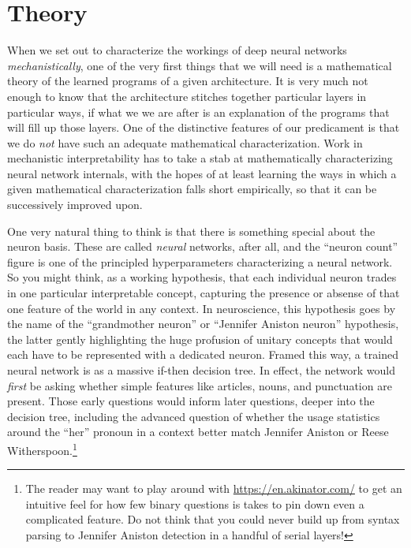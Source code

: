 \section{Theory}
When we set out to characterize the workings of deep neural networks
\emph{mechanistically}, one of the very first things that we will need is a
mathematical theory of the learned programs of a given architecture. It is very
much not enough to know that the architecture stitches together particular
layers in particular ways, if what we we are after is an explanation of the
programs that will fill up those layers. One of the distinctive features of our
predicament is that we do \emph{not} have such an adequate mathematical
characterization. Work in mechanistic interpretability has to take a stab at
mathematically characterizing neural network internals, with the hopes of at
least learning the ways in which a given mathematical characterization falls
short empirically, so that it can be successively improved upon.

One very natural thing to think is that there is something special about the
neuron basis. These are called \emph{neural} networks, after all, and the
``neuron count'' figure is one of the principled hyperparameters characterizing
a neural network. So you might think, as a working hypothesis, that each
individual neuron trades in one particular interpretable concept, capturing the
presence or absense of that one feature of the world in any context. In
neuroscience, this hypothesis goes by the name of the ``grandmother neuron'' or
``Jennifer Aniston neuron'' hypothesis, the latter gently highlighting the huge
profusion of unitary concepts that would each have to be represented with a
dedicated neuron. Framed this way, a trained neural network is as a massive
if-then decision tree. In effect, the network would \emph{first} be asking
whether simple features like articles, nouns, and punctuation are present.
Those early questions would inform later questions, deeper into the decision
tree, including the advanced question of whether the usage statistics around
the ``her'' pronoun in a context better match Jennifer Aniston or Reese
Witherspoon.\footnote{The reader may want to play around with
\url{https://en.akinator.com/} to get an intuitive feel for how few binary
questions is takes to pin down even a complicated feature. Do not think that
you could never build up from syntax parsing to Jennifer Aniston detection in a
handful of serial layers!}

